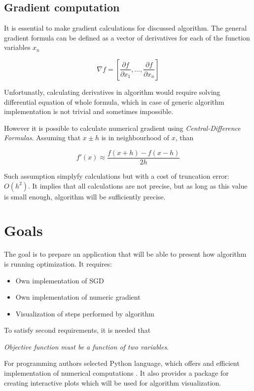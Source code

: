 \documentclass[11pt,a4paper]{IEEEtran}
\begin{document}
\subsection{Gradient computation}

It is essential to make gradient calculations for discussed algorithm. The general gradient formula can be defined as a vector of derivatives for each of the function variables $x_n$

$$ \nabla f = \left[\frac{\partial f}{\partial x_1}, \dots, \frac{\partial f}{\partial x_n}\right] $$

Unfortunatly, calculating derivatives in algorithm would require solving differential equation of whole formula, which in case of generic algorithm implementation is not trivial and sometimes impossible.

However it is possible to calculate numerical gradient using \textit{Central-Difference Formulas}\cite{Mathews:1998}. Assuming that $x \pm h$ is in neighbourhood of $x$, than

$$ f'(x) \approx \frac{f(x+h)-f(x-h)}{2h} $$

Such assumption simplyfy calculations but with a cost of truncation error: $O(h^2)$. It implies that all calculations are not precise, but as long as this value is small enough, algorithm will be sufficiently precise.

\section{Goals}
The goal is to prepare an application that will be able to present how algorithm is running optimization. It requires:
\begin{itemize}
\item Own implementation of SGD
\item Own implementation of numeric gradient
\item Visualization of steps performed by algorithm
\end{itemize}
To satisfy second requirements, it is needed that

\textit{Objective function must be a function of two variables}.

For programming authors selected Python language, which offers and efficient implementation of numerical computations \cite{oliphant_guide_2006}. It also provides a package for creating interactive plots \cite{Hunter:2007} which will be used for algorithm visualization.
\end{document}
